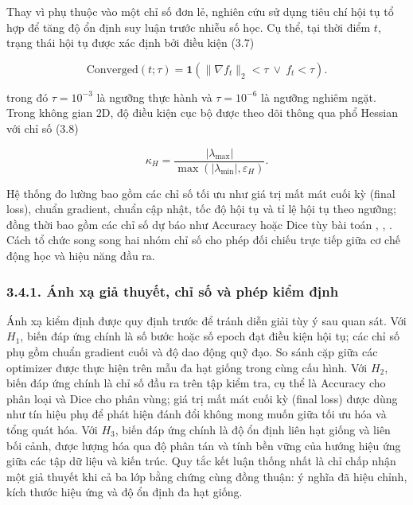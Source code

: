 \documentclass[a4paper,12pt]{article}
\begin{document}
Thay vì phụ thuộc vào một chỉ số đơn lẻ, nghiên cứu sử dụng tiêu chí hội tụ tổ hợp để tăng độ ổn định suy luận trước nhiễu số học. Cụ thể, tại thời điểm $t$, trạng thái hội tụ được xác định bởi điều kiện (3.7)

\begin{equation}
\mathrm{Converged}(t;\tau)=\mathbf{1}\left(\|\nabla f_t\|_2<\tau\ \lor\ f_t<\tau\right).\tag{3.7}
\end{equation}

trong đó $\tau=10^{-3}$ là ngưỡng thực hành và $\tau=10^{-6}$ là ngưỡng nghiêm ngặt. Trong không gian 2D, độ điều kiện cục bộ được theo dõi thông qua phổ Hessian với chỉ số (3.8)

\begin{equation}
\kappa_H=\frac{|\lambda_{\max}|}{\max(|\lambda_{\min}|,\varepsilon_H)}.\tag{3.8}
\end{equation}

Hệ thống đo lường bao gồm các chỉ số tối ưu như giá trị mất mát cuối kỳ (final loss), chuẩn gradient, chuẩn cập nhật, tốc độ hội tụ và tỉ lệ hội tụ theo ngưỡng; đồng thời bao gồm các chỉ số dự báo như Accuracy hoặc Dice tùy bài toán \cite{ref8}, \cite{ref14}, \cite{ref15}. Cách tổ chức song song hai nhóm chỉ số cho phép đối chiếu trực tiếp giữa cơ chế động học và hiệu năng đầu ra.

\subsubsection{3.4.1. Ánh xạ giả thuyết, chỉ số và phép kiểm định}

Ánh xạ kiểm định được quy định trước để tránh diễn giải tùy ý sau quan sát. Với $H_1$, biến đáp ứng chính là số bước hoặc số epoch đạt điều kiện hội tụ; các chỉ số phụ gồm chuẩn gradient cuối và độ dao động quỹ đạo. So sánh cặp giữa các optimizer được thực hiện trên mẫu đa hạt giống trong cùng cấu hình. Với $H_2$, biến đáp ứng chính là chỉ số đầu ra trên tập kiểm tra, cụ thể là Accuracy cho phân loại và Dice cho phân vùng; giá trị mất mát cuối kỳ (final loss) được dùng như tín hiệu phụ để phát hiện đánh đổi không mong muốn giữa tối ưu hóa và tổng quát hóa. Với $H_3$, biến đáp ứng chính là độ ổn định liên hạt giống và liên bối cảnh, được lượng hóa qua độ phân tán và tính bền vững của hướng hiệu ứng giữa các tập dữ liệu và kiến trúc. Quy tắc kết luận thống nhất là chỉ chấp nhận một giả thuyết khi cả ba lớp bằng chứng cùng đồng thuận: ý nghĩa đã hiệu chỉnh, kích thước hiệu ứng và độ ổn định đa hạt giống.
\end{document}
